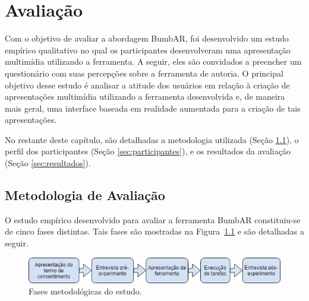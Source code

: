 \documentclass[../main.tex]{subfiles}
\begin{document}
\chapter{Avaliação}\label{cap:avaliacao}

Com o objetivo de avaliar a abordagem BumbAR, foi desenvolvido um estudo empírico qualitativo no qual os participantes desenvolveram uma apresentação multimídia utilizando a ferramenta. A seguir, eles são convidados a preencher um questionário com suas percepções sobre a ferramenta de autoria. O principal objetivo desse estudo é analisar a atitude dos usuários em relação à criação de apresentações multimídia utilizando a ferramenta desenvolvida e, de maneira mais geral, uma interface baseada em realidade aumentada para a criação de tais apresentações.

No restante deste capítulo, são detalhadas a metodologia utilizada (Seção \ref{sec:metodologia}), o perfil dos participantes (Seção \ref{sec:participantes}), e os resultados da avaliação (Seção \ref{sec:resultados}).

\section{Metodologia de Avaliação}
\label{sec:metodologia}

O estudo empírico desenvolvido para avaliar a ferramenta BumbAR constituiu-se de cinco fases distintas. Tais fases são mostradas na Figura~\ref{fig:metodologia_exp} e são detalhadas a seguir.

\begin{figure}[!h]
\centering
\includegraphics[width=0.9\linewidth]{IMG/metodologia_experimento.png}
\caption{Fases metodológicas do estudo.}
\label{fig:metodologia_exp}
\end{figure}
\end{document}
